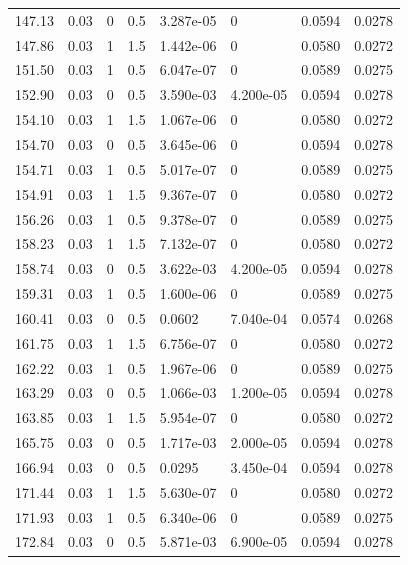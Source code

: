 \documentclass[preview]{standalone}
\begin{document}
{{{\begin{tabular}{L{1.2cm}C{1.2cm} C{0.3cm}C{0.5cm} C{1.4cm}C{1.4cm} C{1.4cm}C{1.4cm}}
  147.13  &  0.03  & 0     & 0.5 &  3.287e-05  & 0  & 0.0594 &  0.0278   \\ 
  147.86  &  0.03  & 1     & 1.5 &  1.442e-06  & 0  & 0.0580 &  0.0272   \\ 
  151.50  &  0.03  & 1     & 0.5 &  6.047e-07  & 0  & 0.0589 &  0.0275   \\ 
  152.90  &  0.03  & 0     & 0.5 &  3.590e-03  & 4.200e-05  & 0.0594 &  0.0278   \\ 
  154.10  &  0.03  & 1     & 1.5 &  1.067e-06  & 0  & 0.0580 &  0.0272   \\ 
  154.70  &  0.03  & 0     & 0.5 &  3.645e-06  & 0  & 0.0594 &  0.0278   \\ 
  154.71  &  0.03  & 1     & 0.5 &  5.017e-07  & 0  & 0.0589 &  0.0275   \\ 
  154.91  &  0.03  & 1     & 1.5 &  9.367e-07  & 0  & 0.0580 &  0.0272   \\ 
  156.26  &  0.03  & 1     & 0.5 &  9.378e-07  & 0  & 0.0589 &  0.0275   \\ 
  158.23  &  0.03  & 1     & 1.5 &  7.132e-07  & 0  & 0.0580 &  0.0272   \\ 
  158.74  &  0.03  & 0     & 0.5 &  3.622e-03  & 4.200e-05  & 0.0594 &  0.0278   \\ 
  159.31  &  0.03  & 1     & 0.5 &  1.600e-06  & 0  & 0.0589 &  0.0275   \\ 
  160.41  &  0.03  & 0     & 0.5 &  0.0602  & 7.040e-04  & 0.0574 &  0.0268   \\ 
  161.75  &  0.03  & 1     & 1.5 &  6.756e-07  & 0  & 0.0580 &  0.0272   \\ 
  162.22  &  0.03  & 1     & 0.5 &  1.967e-06  & 0  & 0.0589 &  0.0275   \\ 
  163.29  &  0.03  & 0     & 0.5 &  1.066e-03  & 1.200e-05  & 0.0594 &  0.0278   \\ 
  163.85  &  0.03  & 1     & 1.5 &  5.954e-07  & 0  & 0.0580 &  0.0272   \\ 
  165.75  &  0.03  & 0     & 0.5 &  1.717e-03  & 2.000e-05  & 0.0594 &  0.0278   \\ 
  166.94  &  0.03  & 0     & 0.5 &  0.0295  & 3.450e-04  & 0.0594 &  0.0278   \\ 
  171.44  &  0.03  & 1     & 1.5 &  5.630e-07  & 0  & 0.0580 &  0.0272   \\ 
  171.93  &  0.03  & 1     & 0.5 &  6.340e-06  & 0  & 0.0589 &  0.0275   \\ 
  172.84  &  0.03  & 0     & 0.5 &  5.871e-03  & 6.900e-05  & 0.0594 &  0.0278   \\ 

\end{tabular}}}}
\end{document}

